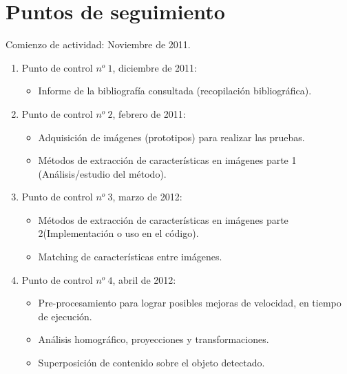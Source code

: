 \documentclass[a4paper,11pt,spanish]{article}
\begin{document}
\section{Puntos de seguimiento}

Comienzo de actividad: Noviembre de 2011.
 
\begin{enumerate}
	\item Punto de control $n^o\ 1$, diciembre de 2011:
		\begin{itemize}
			\item Informe de la bibliografía consultada (recopilación bibliográfica).
		\end{itemize}
		
	\item Punto de control $n^o\ 2$, febrero de 2011:
		\begin{itemize}
		  \item Adquisición de imágenes (prototipos) para realizar las pruebas.			
		  \item Métodos de extracción de características en imágenes parte 1 (Análisis/estudio del método).
		\end{itemize}
		
	\item Punto de control $n^o\ 3$, marzo de 2012:
		\begin{itemize}
			\item Métodos de extracción de características en imágenes parte 2(Implementación o uso en el código).
			\item Matching de características entre imágenes. %
		\end{itemize}	
	
	\item Punto de control $n^o\ 4$, abril de 2012:
		\begin{itemize}
			\item Pre-procesamiento para lograr posibles mejoras de velocidad, en tiempo de ejecución. 
			\item Análisis homográfico, proyecciones y transformaciones.
			\item Superposición de contenido sobre el objeto detectado.
		\end{itemize}
\end{enumerate}
\end{document}
